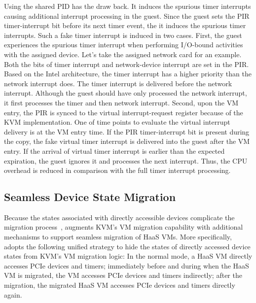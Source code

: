 {Using the shared PID has the draw back. It induces the
spurious timer interrupts causing additional interrupt
processing in the guest. Since the guest sets the PIR
timer-interrupt bit before its next timer event, the it
induces the spurious timer interrupts. Such a fake timer
interrupt is induced in two cases. First, the guest
experiences the spurious timer interrupt when performing
I/O-bound activities with the assigned device. Let's take the
assigned network card for an example. Both the bits of timer
interrupt and network-device interrupt are set in the PIR.
Based on the Intel architecture, the timer interrupt has a
higher priority than the network interrupt does. The timer
interrupt is delivered before the network interrupt. Although
the guest should have only processed the network interrupt, it
first processes the timer and then network interrupt. Second,
upon the VM entry, the PIR is synced to the virtual
interrupt-request register because of the KVM implementation.
One of time points to evaluate the virtual interrupt delivery
is at the VM entry time. If the PIR timer-interrupt bit is
present during the copy, the fake virtual timer interrupt is
delivered into the guest after the VM entry. If the arrival of
virtual timer interrupt is earlier than the expected
expiration, the guest ignores it and processes the next
interrupt. Thus, the CPU overhead is reduced in comparison
with the full timer interrupt processing. 

}
\subsection{Seamless Device State Migration}

Because the states associated with directly accessible devices complicate the migration process~\cite{zhai:2008}, 
\na augments KVM's VM migration capability with additional mechanisms to support seamless migration of HaaS VMs. 
More specifically, \na adopts the following unified strategy to hide the states of directly accessed device states from KVM's VM migration logic:
In the normal mode, a HaaS VM directly accesses PCIe devices and timers; immediately before and during when the HaaS VM is migrated,  the VM 
accesses PCIe devices and timers indirectly; after the migration, the migrated HaaS VM accesses PCIe devices and timers directly again.

